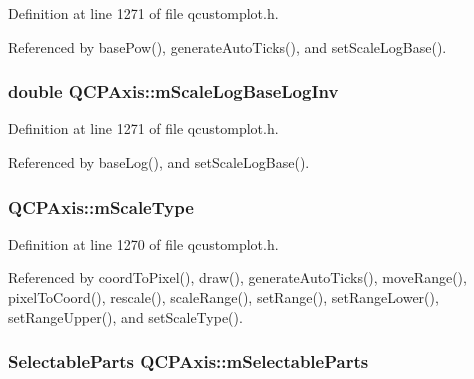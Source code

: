 Definition at line 1271 of file qcustomplot.\+h.



Referenced by base\+Pow(), generate\+Auto\+Ticks(), and set\+Scale\+Log\+Base().

\hypertarget{class_q_c_p_axis_a93e068984b475467929e7f6768754227}{}
\subsubsection[{m\+Scale\+Log\+Base\+Log\+Inv}]{\setlength{\rightskip}{0pt plus 5cm}double Q\+C\+P\+Axis\+::m\+Scale\+Log\+Base\+Log\+Inv\hspace{0.3cm}{\ttfamily [protected]}}\label{class_q_c_p_axis_a93e068984b475467929e7f6768754227}


Definition at line 1271 of file qcustomplot.\+h.



Referenced by base\+Log(), and set\+Scale\+Log\+Base().

\hypertarget{class_q_c_p_axis_ad706039549cbbbec5fcb2baf7894e04d}{}
\subsubsection[{m\+Scale\+Type}]{ Q\+C\+P\+Axis\+::m\+Scale\+Type\hspace{0.3cm}{\ttfamily [protected]}}\label{class_q_c_p_axis_ad706039549cbbbec5fcb2baf7894e04d}


Definition at line 1270 of file qcustomplot.\+h.



Referenced by coord\+To\+Pixel(), draw(), generate\+Auto\+Ticks(), move\+Range(), pixel\+To\+Coord(), rescale(), scale\+Range(), set\+Range(), set\+Range\+Lower(), set\+Range\+Upper(), and set\+Scale\+Type().

\hypertarget{class_q_c_p_axis_ab9042d8a095998f27a28b39411d8b9c3}{}
\subsubsection[{m\+Selectable\+Parts}]{\setlength{\rightskip}{0pt plus 5cm}Selectable\+Parts Q\+C\+P\+Axis\+::m\+Selectable\+Parts\hspace{0.3cm}{\ttfamily [protected]}}\label{class_q_c_p_axis_ab9042d8a095998f27a28b39411d8b9c3}


